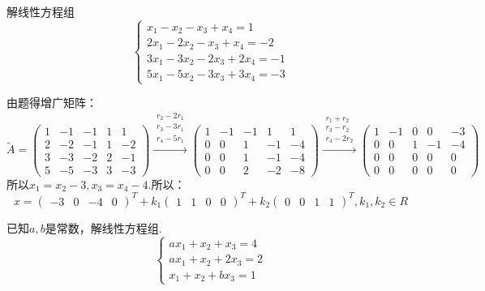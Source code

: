 \documentclass[a4paper]{report}
\begin{document}
\EX 解线性方程组
\begin{equation*}
\begin{cases}
x_1-x_2-x_3+x_4=1\\
2x_1-2x_2-x_3+x_4=-2\\
3x_1-3x_2-2x_3+2x_4=-1\\
5x_1-5x_2-3x_3+3x_4=-3
\end{cases}
\end{equation*}

\begin{jie}
由题得增广矩阵：
\begin{equation*}
\widetilde{A}=
\begin{pmatrix}
1&-1&-1&1&1\\
2&-2&-1&1&-2\\
3&-3&-2&2&-1\\
5&-5&-3&3&-3
\end{pmatrix}
\xrightarrow{\substack{r_2-2r_1\\ r_3-3r_1\\ r_4-5r_1}}{
\begin{pmatrix}
1&-1&-1&1&1\\
0&0&1&-1&-4\\
0&0&1&-1&-4\\
0&0&2&-2&-8
\end{pmatrix}
}
\xrightarrow{\substack{r_1+r_2\\ r_3-r_2\\ r_4-2r_2}}{
\begin{pmatrix}
1&-1&0&0&-3\\
0&0&1&-1&-4\\
0&0&0&0&0\\
0&0&0&0&0
\end{pmatrix}
}
\end{equation*}
所以$x_1=x_2-3,x_3=x_4-4$.所以：
\begin{equation*}
x=
\begin{pmatrix}
-3&0&-4&0
\end{pmatrix}^T+k_{1}
\begin{pmatrix}
1&1&0&0
\end{pmatrix}^T+k_{2}
\begin{pmatrix}
0&0&1&1
\end{pmatrix}^T,k_1,k_2\in R
\end{equation*}
\end{jie}

\EX 已知$a,b$是常数，解线性方程组.
\begin{equation*}
\begin{cases}
ax_1+x_2+x_3=4\\
ax_1+x_2+2x_3=2\\
x_1+x_2+bx_3=1
\end{cases}
\end{equation*}
\end{document}

